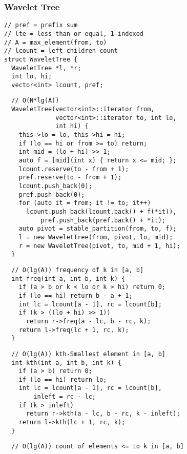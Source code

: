 \documentclass[twoside]{article}
\begin{document}
\begin{multicols*}{2}
\subsubsection*{Wavelet Tree}
\begin{verbatim}
// pref = prefix sum
// lte = less than or equal, 1-indexed
// A = max_element(from, to)
// lcount = left children count
struct WaveletTree {
  WaveletTree *l, *r;
  int lo, hi;
  vector<int> lcount, pref;
\end{verbatim}
\vspace{-12pt}
\begin{verbatim}
  // O(N*lg(A))
  WaveletTree(vector<int>::iterator from,
              vector<int>::iterator to, int lo,
              int hi) {
    this->lo = lo, this->hi = hi;
    if (lo == hi or from >= to) return;
    int mid = (lo + hi) >> 1;
    auto f = [mid](int x) { return x <= mid; };
    lcount.reserve(to - from + 1);
    pref.reserve(to - from + 1);
    lcount.push_back(0);
    pref.push_back(0);
    for (auto it = from; it != to; it++)
      lcount.push_back(lcount.back() + f(*it)),
          pref.push_back(pref.back() + *it);
    auto pivot = stable_partition(from, to, f);
    l = new WaveletTree(from, pivot, lo, mid);
    r = new WaveletTree(pivot, to, mid + 1, hi);
  }
\end{verbatim}
\vspace{-12pt}
\begin{verbatim}
  // O(lg(A)) frequency of k in [a, b]
  int freq(int a, int b, int k) {
    if (a > b or k < lo or k > hi) return 0;
    if (lo == hi) return b - a + 1;
    int lc = lcount[a - 1], rc = lcount[b];
    if (k > ((lo + hi) >> 1))
      return r->freq(a - lc, b - rc, k);
    return l->freq(lc + 1, rc, k);
  }
\end{verbatim}
\vspace{-12pt}
\begin{verbatim}
  // O(lg(A)) kth-Smallest element in [a, b]
  int kth(int a, int b, int k) {
    if (a > b) return 0;
    if (lo == hi) return lo;
    int lc = lcount[a - 1], rc = lcount[b],
        inleft = rc - lc;
    if (k > inleft)
      return r->kth(a - lc, b - rc, k - inleft);
    return l->kth(lc + 1, rc, k);
  }
\end{verbatim}
\vspace{-12pt}
\begin{verbatim}
  // O(lg(A)) count of elements <= to k in [a, b]

\end{verbatim}
\end{multicols*}
\end{document}
